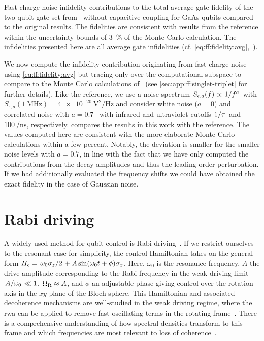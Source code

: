 \begin{table}
    \centering
    \caption{
        Fast charge noise infidelity contributions to the total average gate fidelity of the two-qubit gate set from~ without capacitive coupling for GaAs \sts qubits compared to the original results.
        The fidelities are consistent with results from the reference within the uncertainty bounds of \qty{3}{\percent} of the Monte Carlo calculation.
        The infidelities presented here are all average gate infidelities (cf.
        \cref{eq:ff:fidelity:avg},~).
    }
    \label{tab:ff:infidelities}
    
\end{table}

We now compute the infidelity contribution originating from fast charge noise using \cref{eq:ff:fidelity:avg} but tracing only over the computational subspace to compare to the Monte Carlo calculations of~ (see \cref{sec:app:ff:singlet-triplet} for further details).
Like the reference, we use a noise spectrum $S_{\epsilon,a}(f)\propto \flatfrac{1}{f^a}$ with $S_{\epsilon,a}(\qty{1}{\MHz}) = \qty{4e-20}{\volt\squared\per\Hz}$ and consider white noise ($a = 0$) and correlated noise with $a = 0.7$~\cite{Dial2013} with infrared and ultraviolet cutoffs $\flatfrac{1}{\tau}$ and $\qty{100}{\per\nano\second}$, respectively.
 compares the results in this work with the reference.
The values computed here are consistent with the more elaborate Monte Carlo calculations within a few percent.
Notably, the deviation is smaller for the smaller noise levels with $a = \num{0.7}$, in line with the fact that we have only computed the contributions from the decay amplitudes \decayamps and thus the leading order perturbation.
If we had additionally evaluated the frequency shifts \freqshifts we could have obtained the exact fidelity in the case of Gaussian noise.

\section{Rabi driving}\label{sec:ff:examples:rabi_driving}
A widely used method for qubit control is Rabi driving~\cite{Wallraff2004,Barends2014,Soare2014,Veldhorst2014}.
If we restrict ourselves to the resonant case for simplicity, the control Hamiltonian takes on the general form $\Hc = \flatfrac{\omega_0\sz}{2} + A\sin(\omega_0 t + \phi)\sx$.
Here, $\omega_0$ is the resonance frequency, $A$ the drive amplitude corresponding to the Rabi frequency in the weak driving limit $\flatfrac{A}{\omega_\mr{0}}\ll 1$, $\Omega_{\mathrm{R}}\approx A$, and $\phi$ an adjustable phase giving control over the rotation axis in the $xy$-plane of the Bloch sphere.
This Hamiltonian and associated decoherence mechanisms are well-studied in the weak driving regime, where the \gls{rwa} can be applied to remove fast-oscillating terms in the rotating frame~\cite{Jaynes1963,Gerry2008}.
There is a comprehensive understanding of how spectral densities transform to this frame and which frequencies are most relevant to loss of coherence~\cite{Yan2013}.

